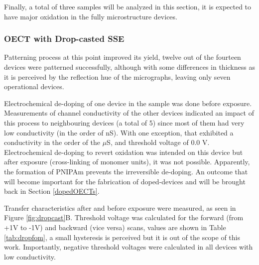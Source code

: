 Finally, a total of three samples will be analyzed in this section, it is expected to have major oxidation in the fully microstructure devices.


\subsubsection{OECT with Drop-casted SSE}%
Patterning process at this point improved its yield, twelve out of the fourteen devices were patterned successfully, although with some differences in thickness as it is perceived by the reflection hue of the micrographs, leaving only seven operational devices. %

Electrochemical de-doping of one device in the sample was done before exposure. Measurements of channel conductivity of the other devices indicated an impact of this process to neighbouring devices (a total of 5) since most of them had very low conductivity (in the order of nS). With one exception, that exhibited a conductivity in the order of the $\mu$S, and threshold voltage of 0.0 V. Electrochemical de-doping to revert oxidation was intended on this device but after exposure (cross-linking of monomer units), it was not possible. Apparently, the formation of PNIPAm prevents the irreversible de-doping. An outcome that will become important for the fabrication of doped-devices and will be brought back in Section \ref{dopedOECTs}.

Transfer characteristics after and before exposure were measured, as seen in Figure \ref{fig:dropcast}B. Threshold voltage was calculated for the forward (from +1V to -1V) and backward (vice versa) scans, values are shown in Table \ref{tab:dropfom}, a small hysteresis is perceived but it is out of the scope of this work. Importantly, negative threshold voltages were calculated in all devices with low conductivity.

